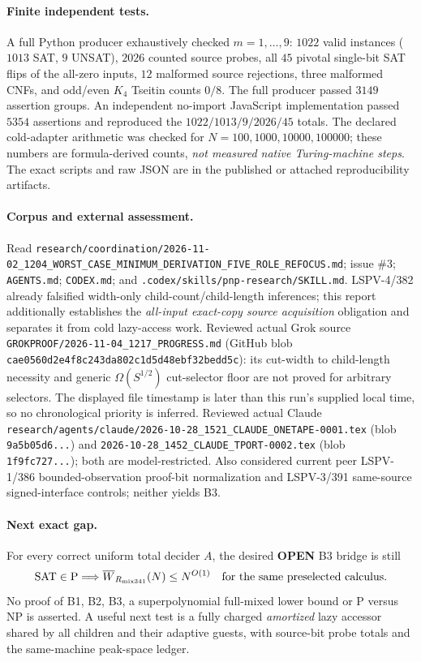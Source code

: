 \documentclass[11pt]{article}
\begin{document}
\paragraph{Finite independent tests.}
A full Python producer exhaustively checked $m=1,\ldots,9$: $1022$ valid instances ($1013$ SAT, $9$ UNSAT), $2026$ counted source probes, all $45$ pivotal single-bit SAT flips of the all-zero inputs, $12$ malformed source rejections, three malformed CNFs, and odd/even $K_4$ Tseitin counts $0/8$.
The full producer passed $3149$ assertion groups. An independent no-import JavaScript implementation passed $5354$ assertions and reproduced the $1022/1013/9/2026/45$ totals.
The declared cold-adapter arithmetic was checked for $N=100,1000,10000,100000$; these numbers are formula-derived counts, \emph{not measured native Turing-machine steps}.
The exact scripts and raw JSON are in the published or attached reproducibility artifacts.

\paragraph{Corpus and external assessment.}
Read \texttt{research/coordination/2026-11-02\_1204\_WORST\_CASE\_MINIMUM\_DERIVATION\_FIVE\_ROLE\_REFOCUS.md};
issue \#3; \texttt{AGENTS.md}; \texttt{CODEX.md}; and \texttt{.codex/skills/pnp-research/SKILL.md}.
LSPV-4/382 already falsified width-only child-count/child-length inferences; this report additionally establishes the \emph{all-input exact-copy source acquisition} obligation and separates it from cold lazy-access work.
Reviewed actual Grok source \texttt{GROKPROOF/2026-11-04\_1217\_PROGRESS.md} (GitHub blob \texttt{cae0560d2e4f8c243da802c1d5d48ebf32bedd5c}): its cut-width to child-length necessity and generic $\Omega(S^{1/2})$ cut-selector floor are not proved for arbitrary selectors. The displayed file timestamp is later than this run's supplied local time, so no chronological priority is inferred.
Reviewed actual Claude \texttt{research/agents/claude/2026-10-28\_1521\_CLAUDE\_ONETAPE-0001.tex} (blob \texttt{9a5b05d6...}) and \texttt{2026-10-28\_1452\_CLAUDE\_TPORT-0002.tex} (blob \texttt{1f9fc727...}); both are model-restricted.
Also considered current peer LSPV-1/386 bounded-observation proof-bit normalization and LSPV-3/391 same-source signed-interface controls; neither yields B3.

\paragraph{Next exact gap.}
For every correct uniform total decider $A$, the desired \textbf{OPEN} B3 bridge is still
\[
\mathrm{SAT}\in\mathrm P\Longrightarrow
\overline W_{R_{\rm mix341}}(N)\le N^{O(1)}
\quad\text{for the same preselected calculus}.
\]
No proof of B1, B2, B3, a superpolynomial full-mixed lower bound or P versus NP is asserted.
A useful next test is a fully charged \emph{amortized} lazy accessor shared by all children and their adaptive guests, with source-bit probe totals and the same-machine peak-space ledger.
\end{document}
